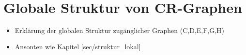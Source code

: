 \section{Globale Struktur von CR-Graphen}
\label{sec/struktur_global}

\begin{itemize}
	\item Erklärung der globalen Struktur zugänglicher Graphen (C,D,E,F,G,H)
	\item Ansonten wie Kapitel \ref{sec/struktur_lokal}
\end{itemize}